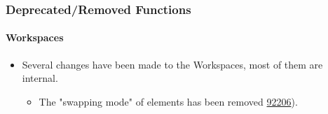%

\begin{frame}[fragile]
	\frametitle{Deprecated/Removed Functions}
	\framesubtitle{Workspaces}

	\begin{itemize}
		\item Several changes have been made to the Workspaces, most of them are internal.

			\begin{itemize}\small
				\item The "swapping mode" of elements has been removed
					\href{https://docs.typo3.org/c/typo3/cms-core/master/en-us/Changelog/11.0/Breaking-92206-RemoveWorkspaceSwappingOfElements.html}{92206}).
			\end{itemize}

	\end{itemize}

\end{frame}

